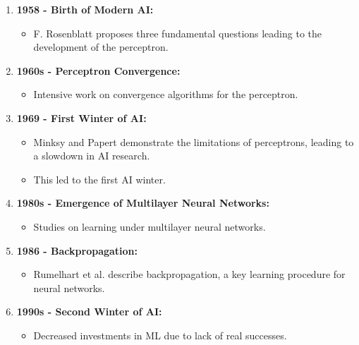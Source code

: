\begin{frame}
{\begin{enumerate}
            \item \textbf{1958 - Birth of Modern AI:}
                  \begin{itemize}
                      \item F. Rosenblatt proposes three fundamental questions leading to the development of the perceptron.
                  \end{itemize}
    
            \item \textbf{1960s - Perceptron Convergence:}
                  \begin{itemize}
                      \item Intensive work on convergence algorithms for the perceptron.
                  \end{itemize}
    
            \item \textbf{1969 - First Winter of AI:}
                  \begin{itemize}
                      \item Minksy and Papert demonstrate the limitations of perceptrons, leading to a slowdown in AI research.
                      \item This led to the first AI winter.
                  \end{itemize}
    
            \item \textbf{1980s - Emergence of Multilayer Neural Networks:}
                  \begin{itemize}
                      \item Studies on learning under multilayer neural networks.
                  \end{itemize}
    
            \item \textbf{1986 - Backpropagation:}
                  \begin{itemize}
                      \item Rumelhart et al. describe backpropagation, a key learning procedure for neural networks.
                  \end{itemize}
    
            \item \textbf{1990s - Second Winter of AI:}
                  \begin{itemize}
                      \item Decreased investments in ML due to lack of real successes.
                  \end{itemize}
    

\end{enumerate}}
\end{frame}
